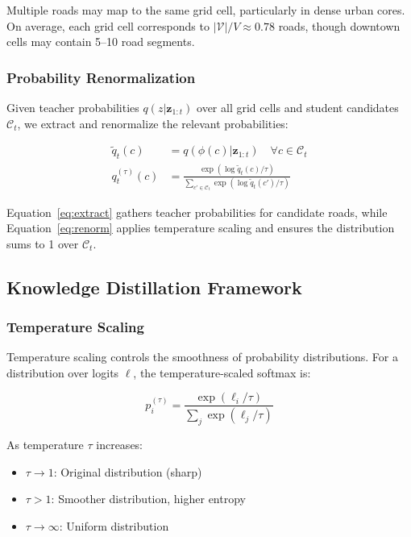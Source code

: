 \begin{remark}
Multiple roads may map to the same grid cell, particularly in dense urban cores. On average, each grid cell corresponds to $|\mathcal{V}|/V \approx 0.78$ roads, though downtown cells may contain 5--10 road segments.
\end{remark}

\subsubsection{Probability Renormalization}
\label{sec:method-renorm}
Given teacher probabilities $q(z | \mathbf{z}_{1:t})$ over all grid cells and student candidates $\mathcal{C}_t$, we extract and renormalize the relevant probabilities:

\begin{align}
\tilde{q}_t(c) &= q(\phi(c) | \mathbf{z}_{1:t}) \quad \forall c \in \mathcal{C}_t \label{eq:extract}\\
q_t^{(\tau)}(c) &= \frac{\exp(\log \tilde{q}_t(c) / \tau)}{\sum_{c' \in \mathcal{C}_t} \exp(\log \tilde{q}_t(c') / \tau)} \label{eq:renorm}
\end{align}

Equation~\eqref{eq:extract} gathers teacher probabilities for candidate roads, while Equation~\eqref{eq:renorm} applies temperature scaling and ensures the distribution sums to 1 over $\mathcal{C}_t$.

\subsection{Knowledge Distillation Framework}
\label{sec:method-distill}

\subsubsection{Temperature Scaling}
\label{sec:method-temp}
Temperature scaling controls the smoothness of probability distributions. For a distribution over logits $\ell$, the temperature-scaled softmax is:

\begin{equation}
p^{(\tau)}_i = \frac{\exp(\ell_i / \tau)}{\sum_j \exp(\ell_j / \tau)}
\label{eq:temp-softmax}
\end{equation}

\begin{definition}
As temperature $\tau$ increases:
\begin{itemize}[noitemsep,topsep=0pt]
\item $\tau \rightarrow 1$: Original distribution (sharp)
\item $\tau > 1$: Smoother distribution, higher entropy
\item $\tau \rightarrow \infty$: Uniform distribution
\end{itemize}
\end{definition}


